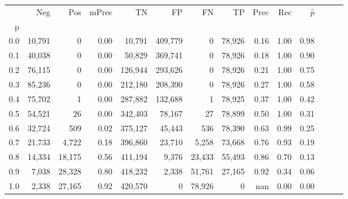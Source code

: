 \begin{tabular}{rrrrrrrrrrrrrr}
\toprule
{} &     Neg &     Pos & mPrec &       TN &       FP &      FN &      TP &  Prec &   Rec & $\hat{p}$ \\
p   &         &         &       &          &          &         &         &       &       &           \\
\midrule
0.0 &  10,791 &       0 &  0.00 &   10,791 &  409,779 &       0 &  78,926 &  0.16 &  1.00 &      0.98 \\
0.1 &  40,038 &       0 &  0.00 &   50,829 &  369,741 &       0 &  78,926 &  0.18 &  1.00 &      0.90 \\
0.2 &  76,115 &       0 &  0.00 &  126,944 &  293,626 &       0 &  78,926 &  0.21 &  1.00 &      0.75 \\
0.3 &  85,236 &       0 &  0.00 &  212,180 &  208,390 &       0 &  78,926 &  0.27 &  1.00 &      0.58 \\
0.4 &  75,702 &       1 &  0.00 &  287,882 &  132,688 &       1 &  78,925 &  0.37 &  1.00 &      0.42 \\
0.5 &  54,521 &      26 &  0.00 &  342,403 &   78,167 &      27 &  78,899 &  0.50 &  1.00 &      0.31 \\
0.6 &  32,724 &     509 &  0.02 &  375,127 &   45,443 &     536 &  78,390 &  0.63 &  0.99 &      0.25 \\
0.7 &  21,733 &   4,722 &  0.18 &  396,860 &   23,710 &   5,258 &  73,668 &  0.76 &  0.93 &      0.19 \\
0.8 &  14,334 &  18,175 &  0.56 &  411,194 &    9,376 &  23,433 &  55,493 &  0.86 &  0.70 &      0.13 \\
0.9 &   7,038 &  28,328 &  0.80 &  418,232 &    2,338 &  51,761 &  27,165 &  0.92 &  0.34 &      0.06 \\
1.0 &   2,338 &  27,165 &  0.92 &  420,570 &        0 &  78,926 &       0 &   nan &  0.00 &      0.00 \\
\bottomrule
\end{tabular}
